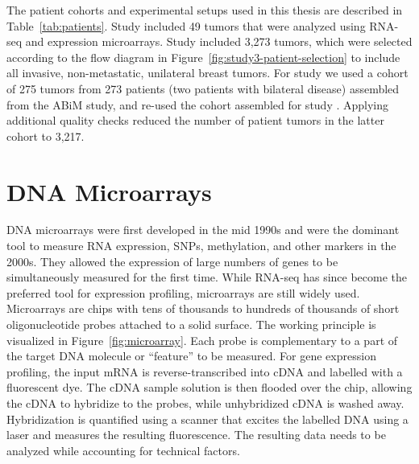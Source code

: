 \documentclass[11pt]{book}
\begin{document}
The patient cohorts and experimental setups used in this thesis are described in Table~\ref{tab:patients}. Study \I included 49 tumors that were analyzed using RNA-seq and expression microarrays. Study \III included 3,273 tumors, which were selected according to the flow diagram in Figure~\ref{fig:study3-patient-selection} to include all invasive, non-metastatic, unilateral breast tumors. For study \IV we used a cohort of 275 tumors from 273 patients (two patients with bilateral disease) assembled from the ABiM study, and re-used the cohort assembled for study \III. Applying additional quality checks reduced the number of patient tumors in the latter cohort to 3,217.


\section{DNA Microarrays}
\label{sec:microarrays}

DNA microarrays were first developed in the mid 1990s \cite{Shalon:1996} and were the dominant tool to measure RNA expression, SNPs, methylation, and other markers in the 2000s. They allowed the expression of large numbers of genes to be simultaneously measured for the first time. While RNA-seq has since become the preferred tool for expression profiling, microarrays are still widely used. Microarrays are chips with tens of thousands to hundreds of thousands of short oligonucleotide probes attached to a solid surface. The working principle is visualized in Figure~\ref{fig:microarray}. Each probe is complementary to a part of the target DNA molecule or ``feature'' to be measured. For gene expression profiling, the input mRNA is reverse-transcribed into cDNA and labelled with a fluorescent dye. The cDNA sample solution is then flooded over the chip, allowing the cDNA to hybridize to the probes, while unhybridized cDNA is washed away. Hybridization is quantified using a scanner that excites the labelled DNA using a laser and measures the resulting fluorescence. The resulting data needs to be analyzed while accounting for technical factors.
\end{document}
